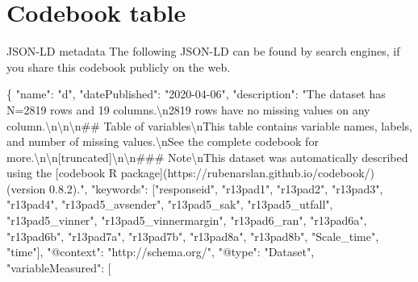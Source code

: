 \documentclass[
]{book}
\newenvironment{Shaded}{\begin{snugshade}}{\end{snugshade}}
\newcommand{\CharTok}[1]{\textcolor[rgb]{0.31,0.60,0.02}{#1}}
\newcommand{\DataTypeTok}[1]{\textcolor[rgb]{0.13,0.29,0.53}{#1}}
\newcommand{\FunctionTok}[1]{\textcolor[rgb]{0.00,0.00,0.00}{#1}}
\newcommand{\OtherTok}[1]{\textcolor[rgb]{0.56,0.35,0.01}{#1}}
\newcommand{\StringTok}[1]{\textcolor[rgb]{0.31,0.60,0.02}{#1}}
\begin{document}
\hypertarget{codebook-table-2}{%
\section{Codebook table}\label{codebook-table-2}}

\hypertarget{htmlwidget-3a809d81e45cbdbad3bb}{}

JSON-LD metadata
The following JSON-LD can be found by search engines, if you share this codebook
publicly on the web.

\begin{Shaded}
\begin{Highlighting}[]
\FunctionTok{\{}
  \DataTypeTok{"name"}\FunctionTok{:} \StringTok{"d"}\FunctionTok{,}
  \DataTypeTok{"datePublished"}\FunctionTok{:} \StringTok{"2020-04-06"}\FunctionTok{,}
  \DataTypeTok{"description"}\FunctionTok{:} \StringTok{"The dataset has N=2819 rows and 19 columns.}\CharTok{\textbackslash{}n}\StringTok{2819 rows have no missing values on any column.}\CharTok{\textbackslash{}n\textbackslash{}n\textbackslash{}n}\StringTok{## Table of variables}\CharTok{\textbackslash{}n}\StringTok{This table contains variable names, labels, and number of missing values.}\CharTok{\textbackslash{}n}\StringTok{See the complete codebook for more.}\CharTok{\textbackslash{}n\textbackslash{}n}\StringTok{[truncated]}\CharTok{\textbackslash{}n\textbackslash{}n}\StringTok{### Note}\CharTok{\textbackslash{}n}\StringTok{This dataset was automatically described using the [codebook R package](https://rubenarslan.github.io/codebook/) (version 0.8.2)."}\FunctionTok{,}
  \DataTypeTok{"keywords"}\FunctionTok{:} \OtherTok{[}\StringTok{"responseid"}\OtherTok{,} \StringTok{"r13pad1"}\OtherTok{,} \StringTok{"r13pad2"}\OtherTok{,} \StringTok{"r13pad3"}\OtherTok{,} \StringTok{"r13pad4"}\OtherTok{,} \StringTok{"r13pad5_avsender"}\OtherTok{,} \StringTok{"r13pad5_sak"}\OtherTok{,} \StringTok{"r13pad5_utfall"}\OtherTok{,} \StringTok{"r13pad5_vinner"}\OtherTok{,} \StringTok{"r13pad5_vinnermargin"}\OtherTok{,} \StringTok{"r13pad6_ran"}\OtherTok{,} \StringTok{"r13pad6a"}\OtherTok{,} \StringTok{"r13pad6b"}\OtherTok{,} \StringTok{"r13pad7a"}\OtherTok{,} \StringTok{"r13pad7b"}\OtherTok{,} \StringTok{"r13pad8a"}\OtherTok{,} \StringTok{"r13pad8b"}\OtherTok{,} \StringTok{"Scale_time"}\OtherTok{,} \StringTok{"time"}\OtherTok{]}\FunctionTok{,}
  \DataTypeTok{"@context"}\FunctionTok{:} \StringTok{"http://schema.org/"}\FunctionTok{,}
  \DataTypeTok{"@type"}\FunctionTok{:} \StringTok{"Dataset"}\FunctionTok{,}
  \DataTypeTok{"variableMeasured"}\FunctionTok{:} \OtherTok{[}

\end{Highlighting}
\end{Shaded}
\end{document}
